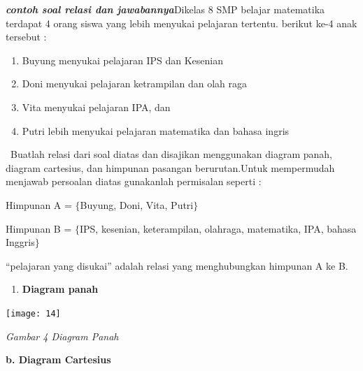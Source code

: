 \documentclass[11pt,fleqn]{book} %
\begin{document}
\noindent \textbf{\textit{contoh soal relasi dan jawabannya}}Dikelas 8 SMP belajar matematika terdapat 4 orang siswa yang lebih menyukai pelajaran tertentu. berikut ke-4 anak tersebut :

\begin{enumerate}
\item  Buyung menyukai pelajaran IPS dan Kesenian

\item  Doni menyukai pelajaran ketrampilan dan olah raga

\item  Vita menyukai pelajaran IPA, dan

\item  Putri lebih menyukai pelajaran matematika dan bahasa ingris
\end{enumerate}

\noindent ~Buatlah relasi dari soal diatas dan disajikan menggunakan diagram panah, diagram cartesius, dan himpunan pasangan berurutan.\textit{}Untuk mempermudah menjawab persoalan diatas gunakanlah permisalan seperti :

\noindent 

\noindent Himpunan A = $\{$Buyung, Doni, Vita, Putri$\}$

\noindent Himpunan B = $\{$IPS, kesenian, keterampilan, olahraga, matematika, IPA, bahasa Inggris$\}$

\noindent ``pelajaran yang disukai'' adalah relasi yang menghubungkan himpunan A ke B.

\noindent 

\noindent 

\noindent 

\noindent 

\noindent 

\noindent 

\begin{enumerate}
\item  \textbf{Diagram panah}
\end{enumerate}

\begin{center}
\noindent \texttt{[image: 14]}~
\end{center}

\noindent 

\noindent 

\noindent \textit{Gambar 4 Diagram Panah}

\noindent \textbf{b. Diagram Cartesius}
\end{document}
